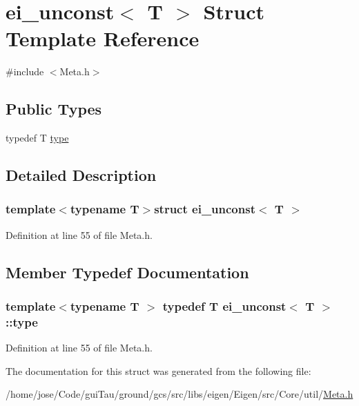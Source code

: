\hypertarget{structei__unconst}{\section{ei\-\_\-unconst$<$ T $>$ Struct Template Reference}
\label{structei__unconst}
}


{\ttfamily \#include $<$Meta.\-h$>$}

\subsection*{Public Types}
\begin{DoxyCompactItemize}
\item 
typedef T \hyperlink{structei__unconst_ad8665cc943520fbcc0af877be5ea6ff6}{type}
\end{DoxyCompactItemize}


\subsection{Detailed Description}
\subsubsection*{template$<$typename T$>$struct ei\-\_\-unconst$<$ T $>$}



Definition at line 55 of file Meta.\-h.



\subsection{Member Typedef Documentation}
\hypertarget{structei__unconst_ad8665cc943520fbcc0af877be5ea6ff6}{
\subsubsection[{type}]{\setlength{\rightskip}{0pt plus 5cm}template$<$typename T $>$ typedef T {\bf ei\-\_\-unconst}$<$ T $>$\-::{\bf type}}}\label{structei__unconst_ad8665cc943520fbcc0af877be5ea6ff6}


Definition at line 55 of file Meta.\-h.



The documentation for this struct was generated from the following file\-:\begin{DoxyCompactItemize}
\item 
/home/jose/\-Code/gui\-Tau/ground/gcs/src/libs/eigen/\-Eigen/src/\-Core/util/\hyperlink{_meta_8h}{Meta.\-h}\end{DoxyCompactItemize}
